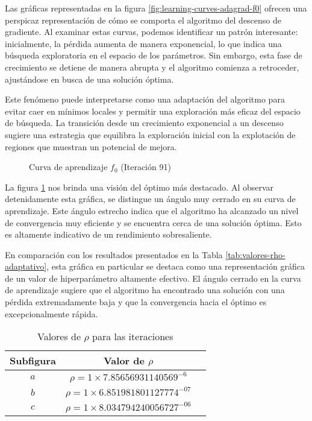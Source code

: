 Las gráficas representadas en la figura \ref{fig:learning-curves-adagrad-f0} ofrecen una perspicaz representación de cómo se comporta el algoritmo del descenso de gradiente. Al examinar estas curvas, podemos identificar un patrón interesante: inicialmente, la pérdida aumenta de manera exponencial, lo que indica una búsqueda exploratoria en el espacio de los parámetros. Sin embargo, esta fase de crecimiento se detiene de manera abrupta y el algoritmo comienza a retroceder, ajustándose en busca de una solución óptima.

Este fenómeno puede interpretarse como una adaptación del algoritmo para evitar caer en mínimos locales y permitir una exploración más eficaz del espacio de búsqueda. La transición desde un crecimiento exponencial a un descenso sugiere una estrategia que equilibra la exploración inicial con la explotación de regiones que muestran un potencial de mejora.

\begin{figure}[h]
  \centering
    
  \caption{Curva de aprendizaje $f_0$ (Iteración 91)}
  \captionsetup{justification=centering}
  \label{fig:learning-adagrad-f0-91}
\end{figure}

La figura \ref{fig:learning-adagrad-f0-91} nos brinda una visión del óptimo más destacado. Al observar detenidamente esta gráfica, se distingue un ángulo muy cerrado en su curva de aprendizaje. Este ángulo estrecho indica que el algoritmo ha alcanzado un nivel de convergencia muy eficiente y se encuentra cerca de una solución óptima. Esto es altamente indicativo de un rendimiento sobresaliente.

En comparación con los resultados presentados en la Tabla \ref{tab:valores-rho-adaptativo}, esta gráfica en particular se destaca como una representación gráfica de un valor de hiperparámetro altamente efectivo. El ángulo cerrado en la curva de aprendizaje sugiere que el algoritmo ha encontrado una solución con una pérdida extremadamente baja y que la convergencia hacia el óptimo es excepcionalmente rápida.
\newpage

\begin{table}[H]
    \centering
    \caption{Valores de $\rho$ para las iteraciones}
    \begin{tabular}{|c|c|c|}
    \hline
    \textbf{Subfigura} & \textbf{Valor de $\rho$} \\
    \hline
    $a$ & $\rho = 1 \times 7.85656931140569^{-6} $ \\
    \hline 
    $b$ & $\rho = 1 \times 6.851981801127774^{-07} $ \\
    \hline
    $c$ & $\rho =  1 \times 8.034794240056727^{-06} $ \\
    \hline
    \end{tabular}
    \label{tab:valores-rho-adaptativo-f1}
\end{table}


